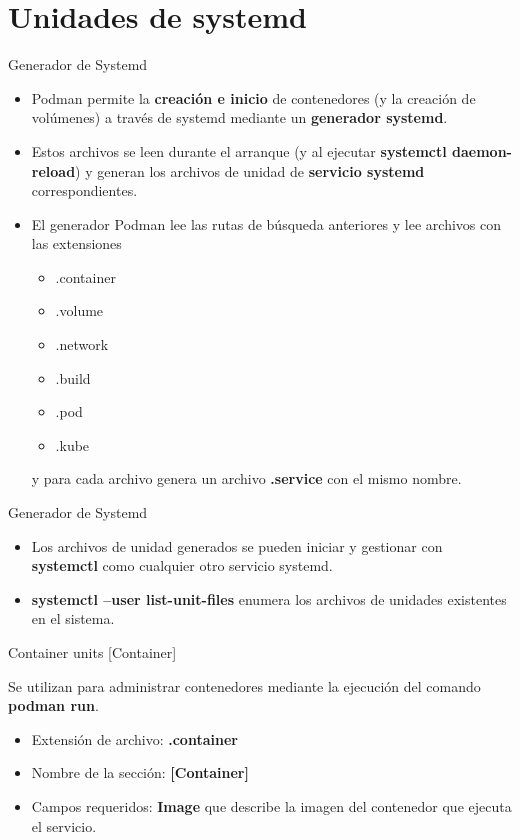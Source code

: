 \section{Unidades de systemd}

\begin{frame}[c]{Generador de Systemd}
  \begin{itemize}
    \item Podman permite la \textbf{creación e inicio} de contenedores
          (y la creación de volúmenes) a través de systemd
          mediante un \textbf{generador systemd}.
    \pausa
    \item Estos archivos se leen durante el arranque (y al ejecutar
      \textbf{systemctl daemon-reload}) y generan los archivos de
      unidad de \textbf{servicio systemd} correspondientes.
    \pausa
    \item El generador Podman lee las rutas de búsqueda anteriores y
      lee archivos con las extensiones
      \begin{itemize}
        \item .container
        \pausa
        \item .volume
        \pausa
        \item .network
        \pausa
        \item .build
        \pausa
        \item .pod
        \pausa
        \item .kube
      \end{itemize}
      y para cada archivo genera un archivo \textbf{.service} con el
      mismo nombre.
  \end{itemize}
\end{frame}

\begin{frame}[c]{Generador de Systemd}
  \begin{itemize}
    \item Los archivos de unidad generados se pueden iniciar y
          gestionar con \textbf{systemctl} como cualquier otro
          servicio systemd.
    \pausa
    \item \textbf{systemctl {--user} list-unit-files} enumera
          los archivos de unidades existentes en el sistema.
  \end{itemize}
\end{frame}

\begin{frame}[c]{Container units [Container]}

  Se utilizan para administrar contenedores mediante la ejecución del
  comando \textbf{podman run}.

  \vspace{\baselineskip}
  \begin{itemize}
    \item Extensión de archivo: \textbf{.container}
    \item Nombre de la sección: \textbf{[Container]}
    \item Campos requeridos: \textbf{Image} que describe la imagen del
      contenedor que ejecuta el servicio.
  \end{itemize}
\end{frame}

